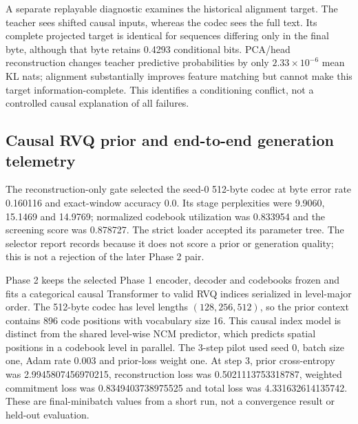 A separate replayable diagnostic examines the historical alignment target.
The teacher sees shifted causal inputs, whereas the codec sees the full text.
Its complete projected target is identical for sequences differing only in
the final byte, although that byte retains 0.4293 conditional bits. PCA/head
reconstruction changes teacher predictive probabilities by only
\(2.33\times10^{-6}\) mean KL nats; alignment substantially improves feature
matching but cannot make this target information-complete. This identifies a
conditioning conflict, not a controlled causal explanation of all failures.

\subsection{Causal RVQ prior and end-to-end generation telemetry}
The reconstruction-only gate selected the seed-0 512-byte codec at byte error
rate 0.160116 and exact-window accuracy 0.0. Its stage perplexities
were 9.9060, 15.1469 and 14.9769; normalized
codebook utilization was 0.833954 and the screening score was
0.878727. The strict loader accepted its parameter tree. The selector
report records  because it does not score a prior or
generation quality; this is not a rejection of the later Phase 2 pair.

Phase 2 keeps the selected Phase 1 encoder, decoder and codebooks frozen and
fits a categorical causal Transformer to valid RVQ indices serialized in
level-major order. The 512-byte codec has level lengths \((128,256,512)\),
so the prior context contains 896 code positions with vocabulary size 16. This
causal index model is distinct from the shared level-wise NCM predictor, which
predicts spatial positions in a codebook level in parallel. The 3-step pilot
used seed 0, batch size one, Adam rate 0.003 and prior-loss weight one. At step
3, prior cross-entropy was 2.9945807456970215, reconstruction loss was
0.5021113753318787, weighted commitment loss was 0.8349403738975525 and total
loss was 4.331632614135742. These are final-minibatch values from a short run,
not a convergence result or held-out evaluation.

